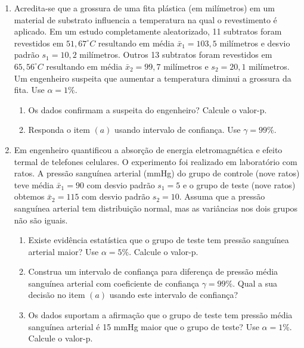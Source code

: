 \documentclass[8pt, a4paper]{article}
\begin{document}
\begin{enumerate}
	\item Acredita-se que a grossura de uma fita plástica (em milímetros) em um material de substrato  influencia a temperatura na qual o revestimento é aplicado. Em um estudo completamente aleatorizado, 11 subtratos foram revestidos em $51,67^\circ C$ resultando em média $\bar{x}_1=103,5$ milímetros e desvio padrão $s_1=10,2$ milímetros. Outros 13 subtratos foram revestidos em $65,56^\circ C$ resultando em média $\bar{x}_2=99,7$ milímetros e $s_2 = 20,1$ milímetros. Um engenheiro suspeita que aumentar a temperatura diminui a grossura da fita. Use $\alpha=1\%$.
	\begin{enumerate}
		\item Os dados confirmam a suspeita do engenheiro? Calcule o valor-p.
		\item Responda o item $(a)$ usando intervalo de confiança. Use $\gamma=99\%$.
	\end{enumerate}

	\item Em engenheiro quantificou a absorção de energia eletromagnética e efeito termal de telefones celulares. O experimento foi realizado em laboratório com ratos. A pressão sanguínea arterial (mmHg) do grupo de controle (nove ratos) teve média $\bar{x}_1=90$ com desvio padrão $s_1=5$ e o grupo de teste (nove ratos) obtemos $\bar{x}_2=115$ com desvio padrão $s_2=10$. Assuma que a pressão sanguínea arterial tem distribuição normal, mas as variâncias nos dois grupos não são iguais.	
	\begin{enumerate}
		\item Existe evidência estatística que o grupo de teste tem pressão sanguínea arterial maior? Use $\alpha=5\%$. Calcule o valor-p.
		\item Construa um intervalo de confiança para diferença de pressão média sanguínea arterial com coeficiente de confiança $\gamma=99\%$. Qual a sua decisão no item $(a)$ usando este intervalo de confiança?
		\item Os dados suportam a afirmação que o grupo de teste tem pressão média sanguínea arterial é 15 mmHg maior que o grupo de teste? Use $\alpha=1\%$. Calcule o valor-p.
	\end{enumerate}


\end{enumerate}
\end{document}
